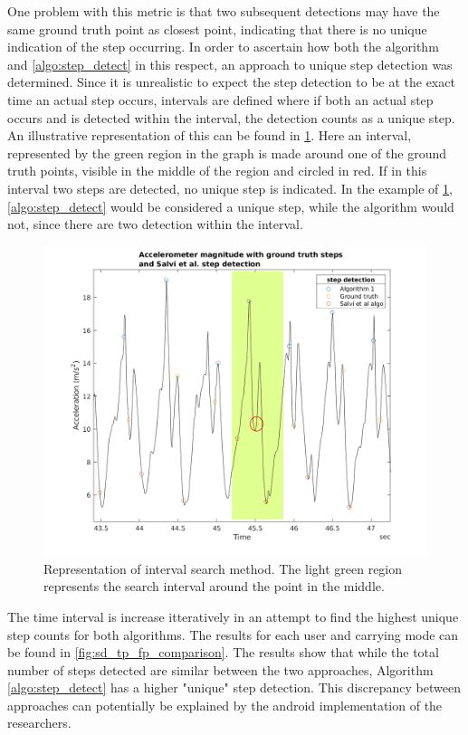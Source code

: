 One problem with this metric is that two subsequent detections may have the same ground truth point as closest point, indicating that there is no unique indication of the step occurring. In order to ascertain how both the \citet{Salvi2018} algorithm and \cref{algo:step_detect} in this respect, an approach to unique step detection was determined. Since it is unrealistic to expect the step detection to be at the exact time an actual step occurs, intervals are defined where if both an actual step occurs and is detected within the interval, the detection counts as a unique step. An illustrative representation of this can be found in \cref{fig:202011121558_true_positive_example_1}. Here an interval, represented by the green region in the graph is made around one of the ground truth points, visible in the middle of the region and circled in red. If in this interval two steps are detected, no unique step is indicated. In the example of  \cref{fig:202011121558_true_positive_example_1},  \cref{algo:step_detect} would be considered a unique step, while the \citet{Salvi2018} algorithm would not, since there are two detection within the interval.

\begin{figure}
	\centering
	\includegraphics[width=0.75\linewidth]{images/20201112_1809_true_positive_example_2}
	\caption{Representation of interval search method. The light green region represents the search interval around the \citet{Salvi2018} point in the middle.}
	\label{fig:202011121558_true_positive_example_1}
\end{figure}

The time interval is increase itteratively in an attempt to find the highest unique step counts for both algorithms. The results for each user and carrying mode can be found in \cref{fig:sd_tp_fp_comparison}. The results show that while the total number of steps detected are similar between the two approaches, Algorithm \ref{algo:step_detect} has a higher "unique" step detection. This discrepancy between approaches can potentially be explained by the android implementation of the researchers. 

